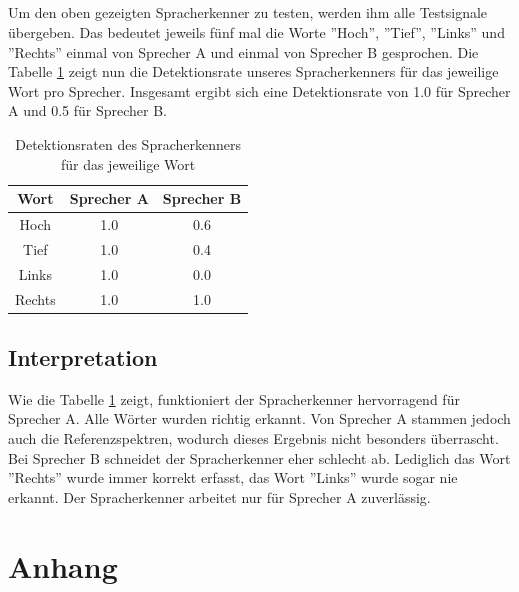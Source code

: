 \documentclass[12pt,oneside,a4paper]{report}
\begin{document}
\paragraph{}

Um den oben gezeigten Spracherkenner zu testen, werden ihm alle Testsignale übergeben. Das bedeutet jeweils fünf mal die Worte ''Hoch'', ''Tief'', ''Links'' und ''Rechts'' einmal von Sprecher A und einmal von Sprecher B gesprochen.
Die Tabelle \ref{tab:DETEKTIONSRATE} zeigt nun die Detektionsrate unseres Spracherkenners für das jeweilige Wort pro Sprecher. Insgesamt ergibt sich eine Detektionsrate von 1.0 für Sprecher A und 0.5 für Sprecher B.

\begin{table}[H]
\centering 
\begin{tabular}{ccc}
\hline
\textbf{Wort} &\textbf{Sprecher A} & \textbf{Sprecher B} \\
\hline
Hoch & 1.0 & 0.6 \\
\hline
Tief & 1.0 & 0.4 \\
\hline
Links & 1.0 & 0.0 \\
\hline
Rechts & 1.0 & 1.0 \\
\hline
\end{tabular} 
\caption{Detektionsraten des Spracherkenners für das jeweilige Wort}
\label{tab:DETEKTIONSRATE}
\end{table}

\section{Interpretation}
\label{chap:VERSUCH_2_INTERPRETATION}

Wie die Tabelle \ref{tab:DETEKTIONSRATE} zeigt, funktioniert der Spracherkenner hervorragend für Sprecher A. Alle Wörter wurden richtig erkannt. Von Sprecher A stammen jedoch auch die Referenzspektren, wodurch dieses Ergebnis nicht besonders überrascht.
Bei Sprecher B schneidet der Spracherkenner eher schlecht ab. Lediglich das Wort ''Rechts'' wurde immer korrekt erfasst, das Wort ''Links'' wurde sogar nie erkannt.
Der Spracherkenner arbeitet nur für Sprecher A zuverlässig.

%
%
\renewcommand\thesection{A.\arabic{section}}
\renewcommand\thesubsection{\thesection.\arabic{subsection}}

\chapter*{Anhang}
\label{chap:APPENDIX}
\addtocounter{chapter}{1}
\setcounter{section}{0}
\end{document}
